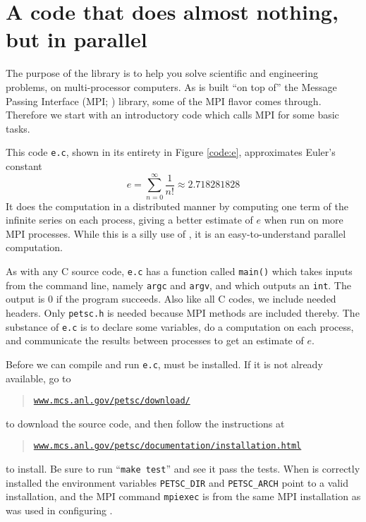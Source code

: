 
\section{A code that does almost nothing, but in parallel}

The purpose of the \PETSc library is to help you solve scientific and engineering problems, on multi-processor computers.  As \PETSc is built ``on top of'' the Message Passing Interface (MPI; \citep{Groppetal1999}) library, some of the MPI flavor comes through.  Therefore we start with an introductory \PETSc code which calls MPI for some basic tasks.

This code \texttt{e.c}, shown in its entirety in Figure \ref{code:e}, approximates Euler's constant
\begin{equation}
e = \sum_{n = 0}^\infty \frac{1}{n!} \approx 2.718281828 \label{introeseries}
\end{equation}
It does the computation in a distributed manner by computing one term of the infinite series on each process, giving a better estimate of $e$ when run on more MPI processes. While this is a silly use of \PETSc, it is an easy-to-understand parallel computation.

As with any C source code, \texttt{e.c} has a function called \texttt{main()} which takes inputs from the command line, namely \texttt{argc} and \texttt{argv}, and which outputs an \texttt{int}.  The output is $0$ if the program succeeds.  Also like all C codes, we include needed headers.  Only \texttt{petsc.h} is needed because MPI methods are included thereby.  The substance of \texttt{e.c} is to declare some variables, do a computation on each process, and communicate the results between processes to get an estimate of $e$.

Before we can compile and run \texttt{e.c}, \PETSc must be installed.  If it is not already available, go to
\begin{quote}
\href{http://www.mcs.anl.gov/petsc/download/index.html}{\texttt{www.mcs.anl.gov/petsc/download/}}
\end{quote}
to download the source code, and then follow the instructions at
\begin{quote}
\href{http://www.mcs.anl.gov/petsc/documentation/installation.html}{\texttt{www.mcs.anl.gov/petsc/documentation/installation.html}}
\end{quote}
to install.  Be sure to run ``\texttt{make test}'' and see it pass the tests.  When \PETSc is correctly installed the environment variables \texttt{PETSC\_DIR} and \texttt{PETSC\_ARCH} point to a valid installation, and the MPI command \texttt{mpiexec} is from the same MPI installation as was used in configuring \PETSc.

